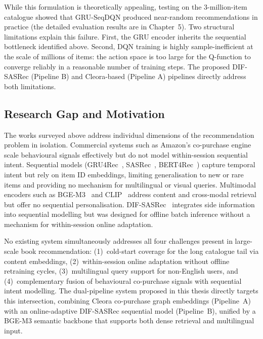 While this formulation is theoretically appealing, testing on the 3-million-item catalogue showed that GRU-SeqDQN produced near-random recommendations in practice (the detailed evaluation results are in Chapter~5).
Two structural limitations explain this failure.
First, the GRU encoder inherits the sequential bottleneck identified above.
Second, DQN training is highly sample-inefficient at the scale of millions of items: the action space is too large for the Q-function to converge reliably in a reasonable number of training steps.
The proposed DIF-SASRec (Pipeline B) and Cleora-based (Pipeline A) pipelines directly address both limitations.

\subsection{Research Gap and Motivation}

The works surveyed above address individual dimensions of the recommendation problem in isolation.
Commercial systems such as Amazon's co-purchase engine~\cite{linden2003amazon} scale behavioural signals effectively but do not model within-session sequential intent.
Sequential models (GRU4Rec~\cite{hidasi2016gru4rec}, SASRec~\cite{kang2018self}, BERT4Rec~\cite{sun2019bert4rec}) capture temporal intent but rely on item ID embeddings, limiting generalisation to new or rare items and providing no mechanism for multilingual or visual queries.
Multimodal encoders such as BGE-M3~\cite{chen2024bge} and CLIP~\cite{radford2021clip} address content and cross-modal retrieval but offer no sequential personalisation.
DIF-SASRec~\cite{xie2022difsasrec} integrates side information into sequential modelling but was designed for offline batch inference without a mechanism for within-session online adaptation.

No existing system simultaneously addresses all four challenges present in large-scale book recommendation: (1)~cold-start coverage for the long catalogue tail via content embeddings, (2)~within-session online adaptation without offline retraining cycles, (3)~multilingual query support for non-English users, and (4)~complementary fusion of behavioural co-purchase signals with sequential intent modelling.
The dual-pipeline system proposed in this thesis directly targets this intersection, combining Cleora co-purchase graph embeddings (Pipeline~A) with an online-adaptive DIF-SASRec sequential model (Pipeline~B), unified by a BGE-M3 semantic backbone that supports both dense retrieval and multilingual input.

